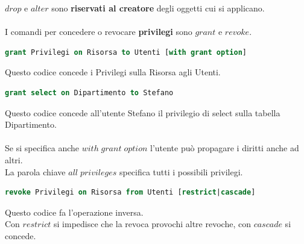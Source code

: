 \documentclass{article}
\begin{document}
	$drop$ e $alter$ sono \textbf{riservati al creatore} degli oggetti cui si applicano.\\\\
	I comandi per concedere o revocare \textbf{privilegi} sono $grant$ e $revoke$.
	\begin{lstlisting}[language=SQL]
		grant Privilegi on Risorsa to Utenti [with grant option]
	\end{lstlisting}
	Questo codice concede i Privilegi sulla Risorsa agli Utenti.
	\begin{lstlisting}[language=SQL]
		grant select on Dipartimento to Stefano
	\end{lstlisting}
	Questo codice concede all'utente Stefano il privilegio di select sulla tabella Dipartimento.\\\\
	Se si specifica anche $with \; grant \; option$ l'utente può propagare i diritti anche ad altri.\\
	La parola chiave $all \; privileges$ specifica tutti i possibili privilegi.
	\begin{lstlisting}[language=SQL]
		revoke Privilegi on Risorsa from Utenti [restrict|cascade]
	\end{lstlisting}
	Questo codice fa l'operazione inversa. \\
	Con $restrict$ si impedisce che la revoca provochi altre revoche, con $cascade$ si concede.
\end{document}
